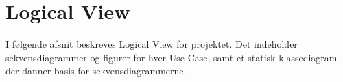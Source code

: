 \documentclass[Main]{subfiles}
\begin{document}
\section{Logical View}
I følgende afsnit beskreves Logical View for projektet.
Det indeholder sekvensdiagrammer og figurer for hver Use Case, samt et statisk klassediagram der danner basis for sekvensdiagrammerne.


\newpage


\newpage

\end{document}
